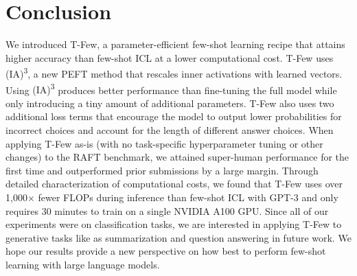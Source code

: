 \section{Conclusion}
\label{sec:conclusion}

We introduced {\selectfont T-Few}, a parameter-efficient few-shot learning recipe that attains higher accuracy than few-shot ICL at a lower computational cost.
{\selectfont T-Few} uses {\selectfont (IA)\textsuperscript{3}}, a new PEFT method that rescales inner activations with learned vectors. Using {\selectfont (IA)\textsuperscript{3}} produces better performance than fine-tuning the full model while only introducing a tiny amount of additional parameters.
{\selectfont T-Few} also uses two additional loss terms that encourage the model to output lower probabilities for incorrect choices and account for the length of different answer choices. When applying {\selectfont T-Few} as-is (with no task-specific hyperparameter tuning or other changes) to the RAFT benchmark, we attained super-human performance for the first time and outperformed prior submissions by a large margin. Through detailed characterization of computational costs, we found that {\selectfont T-Few} uses over 1,000$\times$ fewer FLOPs during inference than few-shot ICL with GPT-3 and only requires 30 minutes to train on a single NVIDIA A100 GPU. Since all of our experiments were on classification tasks, we are interested in applying {\selectfont T-Few} to generative tasks like as summarization and question answering in future work. We hope our results provide a new perspective on how best to perform few-shot learning with large language models.


